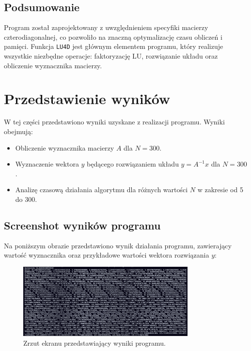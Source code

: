 \documentclass[a4paper,12pt]{article}
\begin{document}
\subsection{Podsumowanie}

Program został zaprojektowany z uwzględnieniem specyfiki macierzy czterodiagonalnej, co pozwoliło na znaczną optymalizację czasu obliczeń i pamięci. Funkcja \texttt{LU4D} jest głównym elementem programu, który realizuje wszystkie niezbędne operacje: faktoryzację LU, rozwiązanie układu oraz obliczenie wyznacznika macierzy.

\section{Przedstawienie wyników}

W tej części przedstawiono wyniki uzyskane z realizacji programu. Wyniki obejmują:
\begin{itemize}
    \item Obliczenie wyznacznika macierzy $A$ dla $N = 300$.
    \item Wyznaczenie wektora $y$ będącego rozwiązaniem układu $y = A^{-1}x$ dla $N = 300$.
    \item Analizę czasową działania algorytmu dla różnych wartości $N$ w zakresie od 5 do 300.
\end{itemize}

\subsection{Screenshot wyników programu}

Na poniższym obrazie przedstawiono wynik działania programu, zawierający wartość wyznacznika oraz przykładowe wartości wektora rozwiązania $y$:

\begin{figure}[h!]
    \centering
    \includegraphics[width=0.8\textwidth]{output_screenshot.png}
    \caption{Zrzut ekranu przedstawiający wyniki programu.}
    \label{fig:output_screenshot}
\end{figure}
\end{document}
